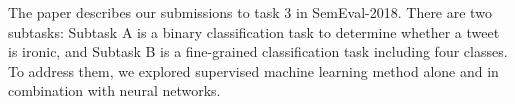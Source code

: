 The paper describes our submissions to task 3 in SemEval-2018. There are two subtasks: Subtask A is a binary classification task to determine whether a tweet is ironic, and Subtask B is a fine-grained classification task including four classes. To address them, we explored supervised machine learning method alone and in combination with neural networks.
